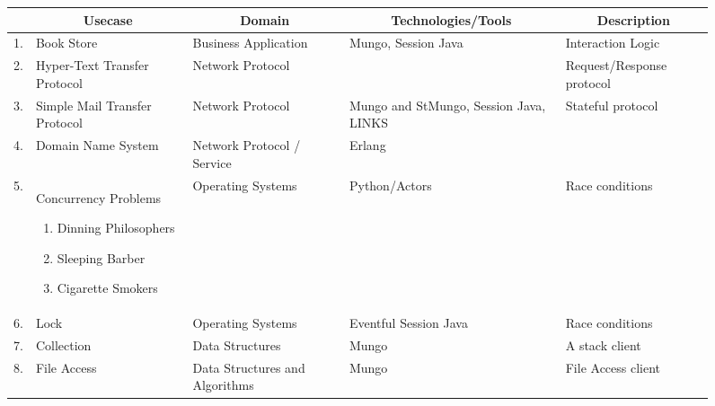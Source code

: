 \begin{figure}
	\begin{longtable}{|l|p{3.2cm}|p{3cm}|p{2.5cm}|p{2.7cm}|}
		\hline
			&	\multicolumn{1}{c|}{Usecase}
							&	\multicolumn{1}{c|}{Domain}
														&	\multicolumn{1}{c|}{Technologies/Tools}
																					&	\multicolumn{1}{c|}{Description}
		\\

		\hline
		1.	&	Book Store	&	Business Application	&	Mungo, Session Java		&	Interaction Logic
		\\

		\hline
		2.	&	Hyper-Text Transfer Protocol
							&	Network Protocol		&							&	Request/Response protocol
		\\

		\hline
		3.	&	Simple Mail Transfer Protocol
							&	Network Protocol		&	Mungo and StMungo, Session Java, LINKS
																					&	Stateful protocol
		\\
		\hline
		4.	&	Domain Name System
							&	Network Protocol / Service		&	Erlang
																					&	
		\\
		\hline
		5.	&	Concurrency	Problems
				\begin{enumerate}[label=$\bullet$]
					\item	Dinning Philosophers
					\item	Sleeping Barber
					\item	Cigarette Smokers
				\end{enumerate}
							&	Operating Systems		&	Python/Actors			&	Race conditions
		\\
		\hline
		6.	&	Lock		&	Operating Systems		&	Eventful Session Java	&	Race conditions
		\\

		\hline
		7.	&	Collection	&	Data Structures			&	Mungo					&	A stack client
		\\

		\hline
		8.	&	File Access	&	Data Structures and Algorithms
														&	Mungo					&	File Access client
		\\


\end{longtable}
\end{figure}
